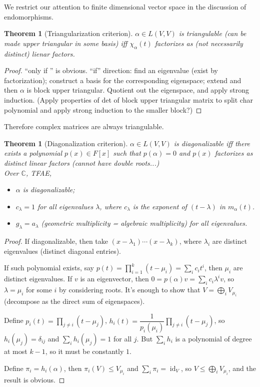 \documentclass{article}
\theoremstyle{definition}
\theoremstyle{remark}
\theoremstyle{plain}
\newtheorem{thm}[defn]{Theorem}
\newcommand{\CC}{\mathbb{C}}
\begin{document}
We restrict our attention to finite dimensional vector space in the discussion of endomorphisms.
\begin{thm}[Triangularization criterion]
    $\alpha\in L(V,V)$ is triangulable (can be made upper triangular in some basis) iff $\chi_\alpha(t)$ factorizes as (not necessarily distinct) lienar factors.
\end{thm}
\begin{proof}
    ``only if '' is obvious. ``if'' direction: find an eigenvalue (exist by factorization); construct a basis for the corresponding eigenspace; extend and then $\alpha$ is block upper triangular. Quotient out the eigenspace, and apply strong induction.
    (Apply properties of det of block upper triangular matrix to split char polynomial and apply strong induction to the smaller block?)
\end{proof}
Therefore complex matrices are always triangulable.
\begin{thm}[Diagonalization criterion]
    $\alpha\in L(V,V)$ is diagonalizable iff there exists a polynomial $p(x)\in F[x]$ such that $p(\alpha)=0$ and $p(x)$ factorizes as distinct linear factors (cannot have double roots...)\\
    Over $\CC$, TFAE,
    \begin{itemize}
        \item $\alpha$ is diagonalizable;
        \item $c_\lambda=1$ for all eigenvalues $\lambda$, where $c_\lambda$ is the exponent of $(t-\lambda)$ in $m_\alpha(t)$.
        \item $g_\lambda=a_\lambda$ (geometric multiplicity = algebraic multiplicity) for all eigenvalues.
    \end{itemize}
\end{thm}
\begin{proof}
If diagonalizable, then take $(x-\lambda_1)\cdots(x-\lambda_k)$, where $\lambda_i$ are distinct eigenvalues (distinct diagonal entries).

If such polynomial exists, say $p(t)=\prod_{i=1}^k(t-\mu_i)=\sum_ic_it^i$, then $\mu_i$ are distinct eigenvalues. If $v$ is an eigenvector, then $0=p(\alpha)v=\sum_{i}c_i\lambda^i v$, so $\lambda=\mu_i$ for some $i$ by considering roots. It's enough to show that $V=\bigoplus_i V_{\mu_i}$ (decompose as the direct sum of eigenspaces).

Define $p_i(t)=\prod_{j\neq i}(t-\mu_j)$, $h_i(t)=\dfrac{1}{p_i(\mu_i)}\prod_{j\neq i}(t-\mu_j)$, so $h_i(\mu_j)=\delta_{ij}$ and $\sum_ih_i(\mu_j)=1$ for all $j$. But $\sum_ih_i$ is a polynomial of degree at most $k-1$, so it must be constantly $1$. 

Define $\pi_i=h_i(\alpha)$, then $\pi_i(V)\le V_{\mu_i}$ and $\sum_{i}\pi_i=\operatorname{id}_V$, so $V\le \bigoplus_i V_{\mu_i}$, and the result is obvious.
\end{proof}
\end{document}
